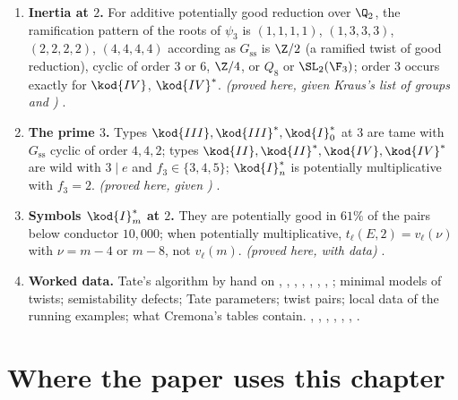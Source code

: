 \begin{enumerate}[label=\textbf{\thechapter.\arabic*}]
\emph{(summary of results proved or stated elsewhere in the chapter)} .
\item \textbf{Inertia at $2$.} For additive potentially good reduction over $\Q_2$, the ramification pattern of the roots of $\psi_3$ is $(1,1,1,1)$,
$(1,3,3,3)$, $(2,2,2,2)$, $(4,4,4,4)$ according as $G_{\mathrm{ss}}$ is $\Z/2$ (a ramified twist of good reduction), cyclic of order $3$ or $6$,
$\Z/4$, or $Q_8$ or $\SL_2(\F_3)$; order $3$ occurs exactly for $\kod{IV}$, $\kod{IV}^*$. \emph{(proved here, given Kraus's list of groups
and )} .
\item \textbf{The prime $3$.} Types $\kod{III},\kod{III}^*,\kod{I}_0^*$ at $3$ are tame with $G_{\mathrm{ss}}$ cyclic of order $4,4,2$; types
$\kod{II},\kod{II}^*,\kod{IV},\kod{IV}^*$ are wild with $3\mid e$ and $f_3\in\{3,4,5\}$; $\kod{I}_n^*$ is potentially multiplicative with $f_3=2$.
\emph{(proved here, given )} .
\item \textbf{Symbols $\kod{I}_m^*$ at $2$.} They are potentially good in $61\%$ of the pairs below conductor $10{,}000$; when potentially
multiplicative, $t_\ell(E,2)=v_\ell(\nu)$ with $\nu=m-4$ or $m-8$, not $v_\ell(m)$. \emph{(proved here, with data)}
.
\item \textbf{Worked data.} Tate's algorithm by hand on , , , , , ,
, ; minimal models of twists; semistability defects; Tate parameters; twist pairs; local data of the running examples;
what Cremona's tables contain. , ,
, , , ,
.
\end{enumerate}

\section*{Where the paper uses this chapter}

